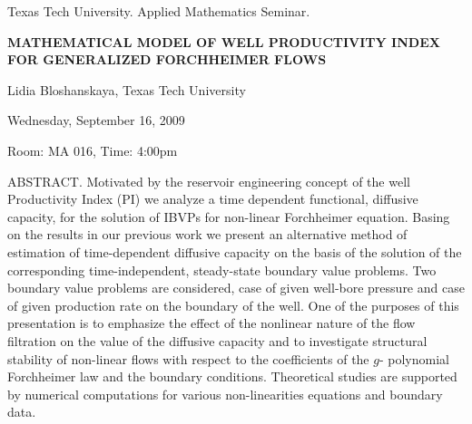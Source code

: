 \documentclass[oneside]{amsart}
\begin{document}
\thispagestyle{empty}
\begin{center}
Texas Tech University.  Applied Mathematics Seminar.

\end{center}

\begin{center}

{\LARGE \uppercase{\textbf{Mathematical model of well productivity index for generalized Forchheimer flows
}}}

Lidia Bloshanskaya, Texas Tech University

Wednesday, September 16, 2009

Room: MA 016, Time: 4:00pm

\end{center}

ABSTRACT.
Motivated by the reservoir engineering concept of the well Productivity Index (PI) we analyze a time dependent functional,  diffusive capacity,  for the solution of IBVPs for non-linear Forchheimer equation.  Basing on the results in our previous work we present an alternative method of estimation of time-dependent diffusive capacity on the basis of the solution of the corresponding time-independent, steady-state boundary value problems.
Two boundary value problems are considered, case of given well-bore pressure and case of given production rate on the boundary of the well. One of the purposes of this presentation is to emphasize the effect of the nonlinear nature of the flow filtration on the value of the diffusive capacity and to investigate structural stability of   non-linear flows with respect to the coefficients of the $g$- polynomial Forchheimer law and the boundary conditions. Theoretical studies are supported by numerical computations for various non-linearities equations and boundary data.
\end{document}
